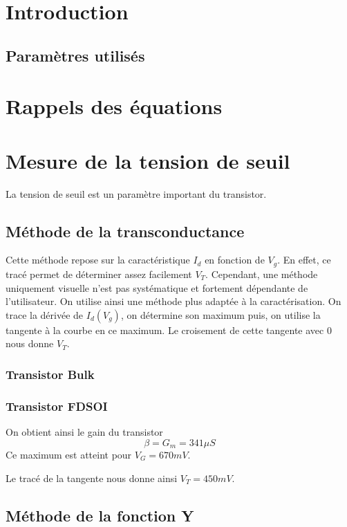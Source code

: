 \documentclass[a4paper,11pt]{report}
\begin{document}


\chapter*{Introduction}

\section*{Paramètres utilisés}

\chapter{Rappels des équations}

\chapter{Mesure de la tension de seuil}
La tension de seuil est un paramètre important du transistor. %
\section{Méthode de la transconductance}

Cette méthode repose sur la caractéristique $I_d$ en fonction de $V_g$. En effet, ce tracé permet de déterminer assez facilement $V_T$. Cependant, une méthode uniquement visuelle n'est pas systématique et fortement dépendante de l'utilisateur. On utilise ainsi une méthode plus adaptée à la caractérisation. On trace la dérivée de $I_d(V_g)$, on détermine son maximum puis, on utilise la tangente à la courbe en ce maximum. Le croisement de cette tangente avec 0 nous donne $V_T$.

\subsection{Transistor Bulk}
\subsection{Transistor FDSOI}
\noindent On obtient ainsi le gain du transistor \[\beta=G_m=341\mu S\] Ce maximum est atteint pour $V_G=670mV$.

Le tracé de la tangente nous donne ainsi $V_T=450mV$.

\section{Méthode de la fonction Y}
\end{document}
